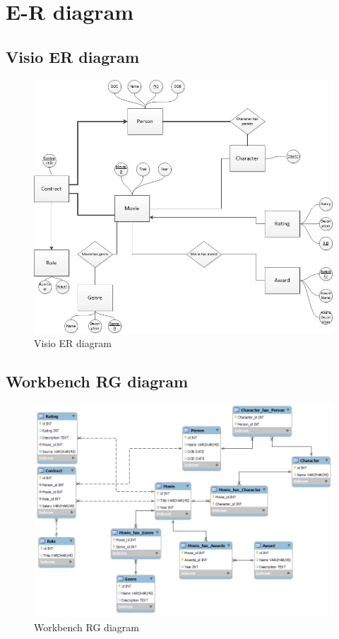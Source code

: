 \section{E-R diagram}
\subsection{Visio ER diagram}
\begin{figure}[h!]
\includegraphics[width=\textwidth,natwidth=825,natheight=699]{illustrations/ER.jpg}
  \caption{Visio ER diagram}
\end{figure}
\subsection{Workbench RG diagram}
\begin{figure}[h!]
\includegraphics[width=\textwidth,natwidth=940,natheight=670]{illustrations/RG.png}
  \caption{Workbench RG diagram}
\end{figure}
\newpage
